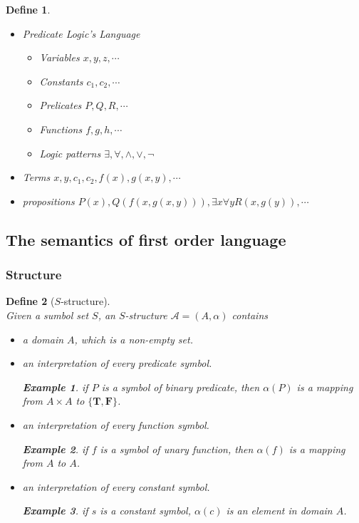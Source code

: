 \documentclass{ctexart}
\newcommand{\。}{．} %
\newenvironment{kuang3}{
    \begin{tcolorbox}[enhanced, colback=hlan!5!white, boxrule=0pt, frame hidden,
        borderline south={0.5mm}{0.1mm}{hlan}]
    }
    {\end{tcolorbox}}
\newenvironment{lvse}{
    \begin{tcolorbox}[enhanced, colback=qlv, boxrule=0pt, frame hidden,
        borderline west={0.7mm}{0.1mm}{slv}]
    }
    {\end{tcolorbox}}
\theoremstyle{t} %
\newtheorem{dyhj}{\color{slv} Define}[subsection] %
\newtheorem{lthj}{\color{szi} Example}[subsection]
\newenvironment{dy}{\begin{lvse}\begin{dyhj}}{\end{dyhj}\end{lvse}}
\begin{document}
\begin{dy} \quad
    \begin{itemize}
        \item Predicate Logic's Language
        \begin{itemize}
            \item Variables $x, y, z, \cdots$
            \item Constants $c_1, c_2, \cdots$
            \item Prelicates $P, Q, R, \cdots$
            \item Functions $f, g, h, \cdots$
            \item Logic patterns $\exists, \forall, \land, \lor, \lnot$
        \end{itemize}
        \item Terms $x, y, c_1, c_2, f(x), g(x, y), \cdots$
        \item propositions $P(x), Q(f(x, g(x, y))), \exists x \forall y R(x, g(y)), \cdots$
    \end{itemize}
\end{dy}

\begin{kuang3}
    \subsection{The semantics of first order language}
\end{kuang3}

\subsubsection{Structure}

\begin{dy}[$S$-structure]\quad \\
    Given a sumbol set $S$, an $S$-structure $\mathcal{A} = \left(A, \alpha\right)$ contains
    \begin{itemize}
        \item a domain $A$, which is a non-empty set.
        \item an interpretation of every predicate symbol.
        \begin{lthj}
            if $P$ is a symbol of binary predicate, then $\alpha(P)$ is a mapping from $A \times A$ to $\{\mathbf{T}, \mathbf{F}\}$.
        \end{lthj}
        \item an interpretation of every function symbol.
        \begin{lthj}
            if $f$ is a symbol of unary function, then $\alpha(f)$ is a mapping from $A$ to $A$.
        \end{lthj}
        \item an interpretation of every constant symbol.
        \begin{lthj}
            if $s$ is a constant symbol, $\alpha(c)$ is an element in domain $A$.
        \end{lthj}
    \end{itemize}
\end{dy}
\end{document}
